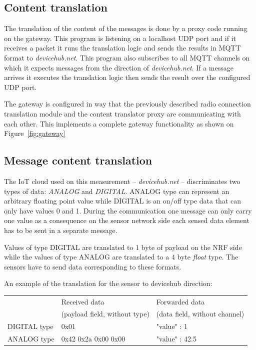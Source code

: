 \documentclass[a4paper]{article}
\begin{document}
\subsection{Content translation}

The translation of the content of the messages is done by a proxy code running on the gateway.
This program is listening on a localhost UDP port and if it receives a packet it runs the
translation logic and sends the results in MQTT format to \emph{devicehub.net}. This program
also subscribes to all MQTT channels on which it expects messages from the direction of \emph{devicehub.net}.
If a message arrives it executes the translation logic then sends the result over the 
configured UDP port.

The gateway is configured in way that the previously described radio connection translation 
module and the content translator proxy are communicating with each other. This implements a complete
gateway functionality as shown on Figure~\ref{fig:gateway}

\subsection{Message content translation}

The IoT cloud used on this measurement -- \emph{devicehub.net} -- discriminates two types of 
data: \emph{ANALOG} and \emph{DIGITAL}. ANALOG type can represent an arbitrary floating point
value while DIGITAL is an on/off type data that can only have values 0 and 1.
During the communication one message can only carry one value as a consequence on the sensor
network side each sensed data element has to be sent in a separate message.

Values of type DIGITAL are translated to 1 byte of payload on the NRF side while the values
of type ANALOG are translated to a 4 byte \emph{float} type. The sensors have to send data
corresponding to these formats.

An example of the translation for the sensor to devicehub direction:


\begin{tabular}{|l|l|l|}
\hline
 & Received data  & Forwarded data  \\
 & (payload field, without type) & (data field, without channel) \\
 \hline
DIGITAL type & 0x01 & {"value" : 1} \\
\hline
ANALOG type & 0x42 0x2a 0x00 0x00 & {"value" : 42.5} \\
\hline
\end{tabular}
\end{document}
